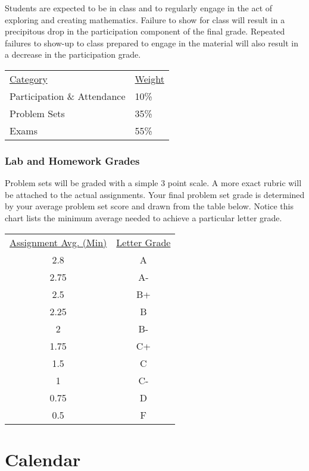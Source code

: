 \documentclass[nobib]{tufte-handout}
\begin{document}
Students are expected to be in class and to regularly engage in the act of exploring and creating mathematics. Failure to show for class will result in a precipitous drop in the participation component of the final grade. Repeated failures to show-up to class prepared to engage in the material will also result in a decrease in the participation grade.

\begin{center}
\begin{tabular}{ll}
\underline{Category} & \underline{Weight}  \\
Participation \& Attendance & 10\% \\
Problem Sets & 35\% \\
Exams & 55\%
\end{tabular}
\end{center}

\subsubsection{Lab and Homework Grades}

Problem sets will be graded with a simple 3 point scale. A more exact rubric will be attached to the actual assignments. Your final problem set grade is determined by your average problem set score and drawn from the table below. Notice this chart lists the minimum average needed to achieve a particular letter grade.

\begin{center}
\begin{small}
\begin{tabular}{cc}
\underline{Assignment Avg. (Min)} & \underline{Letter Grade} \\
2.8   & A  \\
2.75    & A- \\
2.5 & B+ \\
2.25    & B  \\
2   & B- \\
1.75    & C+ \\
1.5 & C  \\
1   & C- \\
0.75    & D  \\
0.5  & F
\end{tabular}
\end{small}
\end{center}

\section{Calendar}
\end{document}
